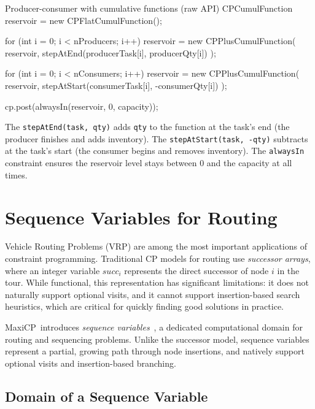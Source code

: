 \documentclass[11pt, a4paper]{scrartcl}
\newcommand{\maxicp}{\textsf{MaxiCP}}
\begin{document}
\begin{codebox}[label={lst:reservoir}]{Producer-consumer with cumulative functions (raw API)}
CPCumulFunction reservoir = new CPFlatCumulFunction();

for (int i = 0; i < nProducers; i++) {
    reservoir = new CPPlusCumulFunction(
        reservoir,
        stepAtEnd(producerTask[i], producerQty[i])
    );
}

for (int i = 0; i < nConsumers; i++) {
    reservoir = new CPPlusCumulFunction(
        reservoir,
        stepAtStart(consumerTask[i], -consumerQty[i])
    );
}

cp.post(alwaysIn(reservoir, 0, capacity));
\end{codebox}

The \texttt{stepAtEnd(task, qty)} adds \texttt{qty} to the function at the task's end (the producer finishes and adds inventory).
The \texttt{stepAtStart(task, -qty)} subtracts at the task's start (the consumer begins and removes inventory).
The \texttt{alwaysIn} constraint ensures the reservoir level stays between 0 and the capacity at all times.



\section{Sequence Variables for Routing}
\label{sec:seqvar}

Vehicle Routing Problems (VRP) are among the most important applications of constraint programming. Traditional CP models for routing use \emph{successor arrays}, where an integer variable $\mathit{succ}_i$ represents the direct successor of node $i$ in the tour. While functional, this representation has significant limitations: it does not naturally support optional visits, and it cannot support insertion-based search heuristics, which are critical for quickly finding good solutions in practice.

\maxicp\ introduces \emph{sequence variables}~\cite{Schaus2022SeqVar}, a dedicated computational domain for routing and sequencing problems. Unlike the successor model, sequence variables represent a partial, growing path through node insertions, and natively support optional visits and insertion-based branching.

\subsection{Domain of a Sequence Variable}
\end{document}
